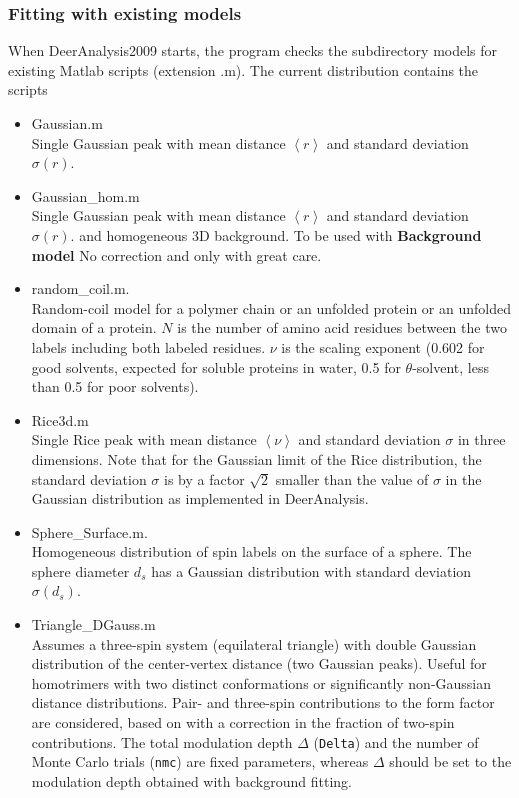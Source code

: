 \documentclass{article}
\begin{document}
\subsubsection{Fitting with existing models}
\label{fit_existing}
When DeerAnalysis2009 starts, the program checks the subdirectory {\ttfamily models} for existing Matlab scripts (extension {\ttfamily .m}). The current distribution contains the scripts 
\begin{itemize}
	\item {\ttfamily Gaussian.m} \\ Single Gaussian peak with mean distance $\left\langle r \right\rangle$ and standard deviation $\sigma(r)$.
	\item {\ttfamily Gaussian\_hom.m} \\ Single Gaussian peak with mean distance $\left\langle r \right\rangle$ and standard deviation $\sigma(r)$. and homogeneous 3D background. To be used with {\bf Background model} {\ttfamily No correction} and only with great care.
	\item {\ttfamily random\_coil.m}. \\ Random-coil model for a polymer chain or an unfolded protein or an unfolded domain of a protein. $N$ is the number of amino acid residues between the two labels including both labeled
 residues. $\nu$ is the scaling exponent (0.602 for good solvents, expected for soluble proteins in water, 0.5 for $\theta$-solvent, less than 0.5 for poor solvents).
 	\item {\ttfamily Rice3d.m} \\ Single Rice peak \cite{koehler2011} with mean distance $\left\langle \nu\right\rangle$ and standard deviation $\sigma$ in three dimensions. Note that for the Gaussian limit of the Rice distribution, the standard deviation $\sigma$ is by a factor $\sqrt{2}$ smaller than the value of $\sigma$ in the Gaussian distribution as implemented in DeerAnalysis.
\item {\ttfamily Sphere\_Surface.m}. \\ Homogeneous distribution of spin labels on the surface of a sphere. The sphere diameter $d_s$ has a Gaussian distribution with standard deviation $\sigma(d_s)$. 
  \item {\ttfamily Triangle\_DGauss.m} \\ Assumes a three-spin system (equilateral triangle) with double Gaussian distribution of the center-vertex distance (two Gaussian peaks). Useful for homotrimers with two distinct conformations or significantly non-Gaussian distance distributions. Pair- and three-spin contributions to the form factor are considered, based on \cite{jeschke2009} with a correction in the fraction of two-spin contributions. The total modulation depth $\Delta$ (\texttt{Delta}) and the number of Monte Carlo trials (\texttt{nmc}) are fixed parameters, whereas $\Delta$  should be set to the modulation depth obtained with background fitting.  

\end{itemize}
\end{document}
